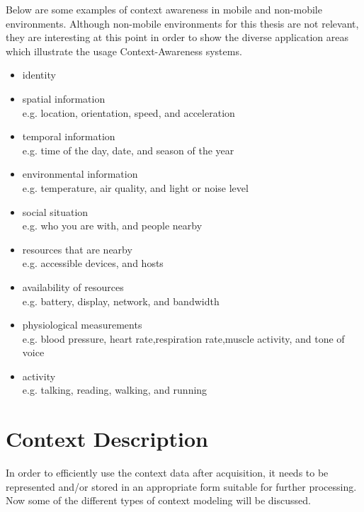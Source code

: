 Below are some examples of context awareness in mobile and non-mobile environments. Although non-mobile environments for this thesis are not relevant, they are interesting at this point in order to show the diverse application areas which illustrate the usage Context-Awareness systems.

\begin{itemize}
\item identity
\item spatial information\\
e.g. location, orientation, speed, and acceleration
\item temporal information\\
e.g. time of the day, date, and season of the year
\item environmental information\\
e.g. temperature, air quality, and light or noise level
\item social situation\\
e.g. who you are with, and people nearby
\item resources that are nearby\\
e.g. accessible devices, and hosts
\item availability of resources\\
e.g. battery, display, network, and bandwidth
\item physiological measurements\\
e.g. blood pressure, heart rate,respiration rate,muscle activity, and tone of voice
\item activity\\
e.g. talking, reading, walking, and running
\end{itemize}

\section{Context Description\label{sec:back_con_de}}
In order to efficiently use the context data after acquisition, it needs to be represented and/or stored in an appropriate form suitable for further processing. Now some of the different types of context modeling will be discussed.

